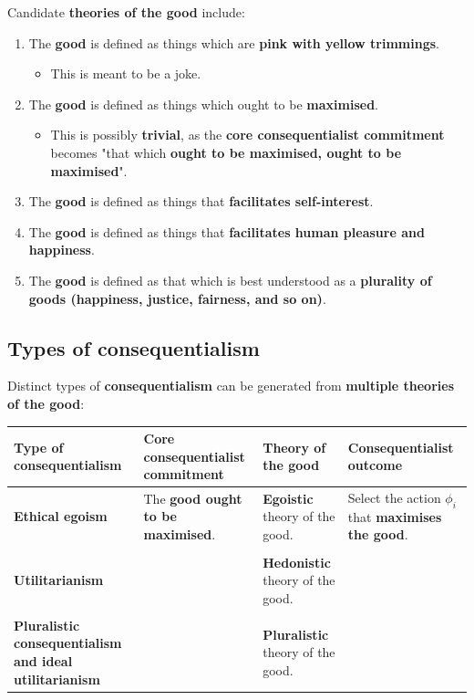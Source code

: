 \documentclass[11pt]{article}
\begin{document}
Candidate \textbf{theories of the good} include:
\begin{enumerate}
\item The \textbf{good} is defined as things which are \textbf{pink with yellow trimmings}.
\begin{itemize}
\item This is meant to be a joke.
\end{itemize}
\item The \textbf{good} is defined as things which ought to be \textbf{maximised}.
\begin{itemize}
\item This is possibly \textbf{trivial}, as the \textbf{core consequentialist commitment} becomes "that which \textbf{ought to be maximised, ought to be maximised}".
\end{itemize}
\item The \textbf{good} is defined as things that \textbf{facilitates self-interest}.
\item The \textbf{good} is defined as things that \textbf{facilitates human pleasure and happiness}.
\item The \textbf{good} is defined as that which is best understood as a \textbf{plurality of goods (happiness, justice, fairness, and so on)}.
\end{enumerate}

 \newpage
\subsection{Types of consequentialism}
\label{sec:org3c1d679}
Distinct types of \textbf{consequentialism} can be generated from \textbf{multiple theories of the good}:
\begin{center}
\begin{tabularx}{\textwidth}{|X|X|X|X|}
\hline
Type of consequentialism & Core consequentialist commitment & Theory of the good & Consequentialist outcome\\
\hline
\textbf{Ethical egoism} & The \textbf{good ought to be maximised}. & \textbf{Egoistic} theory of the good. & Select the action \(\phi_i\) that \textbf{maximises the good}.\\
 &  &  & \\
\textbf{Utilitarianism} &  & \textbf{Hedonistic} theory of the good. & \\
 &  &  & \\
\textbf{Pluralistic consequentialism and ideal utilitarianism} &  & \textbf{Pluralistic} theory of the good. & \\
\hline
\end{tabularx}
\end{center}
\end{document}
